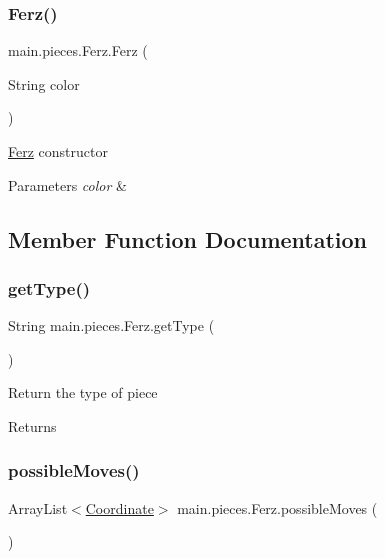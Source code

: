 \subsubsection{\texorpdfstring{Ferz()}{Ferz()}}
{\footnotesize\ttfamily main.\+pieces.\+Ferz.\+Ferz (\begin{DoxyParamCaption}\item[{String}]{color }\end{DoxyParamCaption})}

\hyperlink{classmain_1_1pieces_1_1_ferz}{Ferz} constructor 
\begin{DoxyParams}{Parameters}
{\em color} & \\
\hline
\end{DoxyParams}


\subsection{Member Function Documentation}
\hypertarget{classmain_1_1pieces_1_1_ferz_ad103c7f8a3d02e36fb8d6a52db0ef7cc}{}\label{classmain_1_1pieces_1_1_ferz_ad103c7f8a3d02e36fb8d6a52db0ef7cc} 
\subsubsection{\texorpdfstring{get\+Type()}{getType()}}
{\footnotesize\ttfamily String main.\+pieces.\+Ferz.\+get\+Type (\begin{DoxyParamCaption}{ }\end{DoxyParamCaption})}

Return the type of piece \begin{DoxyReturn}{Returns}

\end{DoxyReturn}
\hypertarget{classmain_1_1pieces_1_1_ferz_a46bd9fd8889a0209540603f723b233af}{}\label{classmain_1_1pieces_1_1_ferz_a46bd9fd8889a0209540603f723b233af} 
\subsubsection{\texorpdfstring{possible\+Moves()}{possibleMoves()}}
{\footnotesize\ttfamily Array\+List$<$\hyperlink{classmain_1_1model_1_1_coordinate}{Coordinate}$>$ main.\+pieces.\+Ferz.\+possible\+Moves (\begin{DoxyParamCaption}{ }\end{DoxyParamCaption})}

